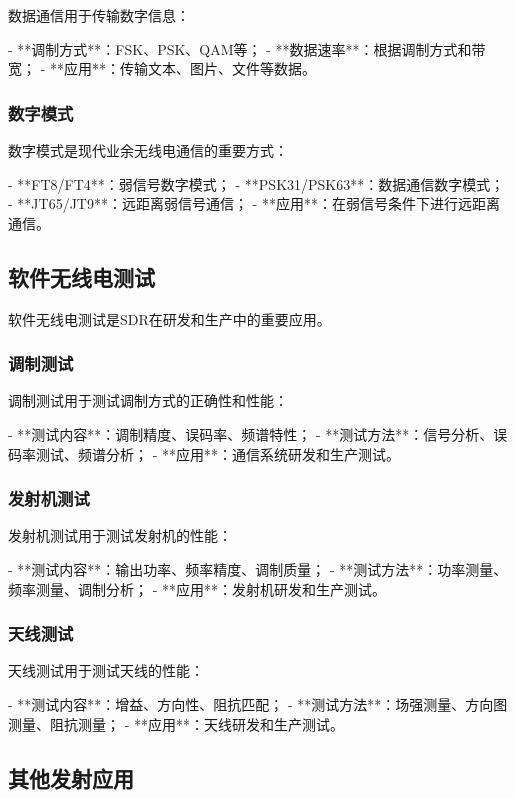 ﻿\documentclass[UTF8]{ctexbook}
\begin{document}
数据通信用于传输数字信息：

- **调制方式**：FSK、PSK、QAM等；
- **数据速率**：根据调制方式和带宽；
- **应用**：传输文本、图片、文件等数据。

\subsubsection{数字模式}

数字模式是现代业余无线电通信的重要方式：

- **FT8/FT4**：弱信号数字模式；
- **PSK31/PSK63**：数据通信数字模式；
- **JT65/JT9**：远距离弱信号通信；
- **应用**：在弱信号条件下进行远距离通信。

\subsection{软件无线电测试}

软件无线电测试是SDR在研发和生产中的重要应用。

\subsubsection{调制测试}

调制测试用于测试调制方式的正确性和性能：

- **测试内容**：调制精度、误码率、频谱特性；
- **测试方法**：信号分析、误码率测试、频谱分析；
- **应用**：通信系统研发和生产测试。

\subsubsection{发射机测试}

发射机测试用于测试发射机的性能：

- **测试内容**：输出功率、频率精度、调制质量；
- **测试方法**：功率测量、频率测量、调制分析；
- **应用**：发射机研发和生产测试。

\subsubsection{天线测试}

天线测试用于测试天线的性能：

- **测试内容**：增益、方向性、阻抗匹配；
- **测试方法**：场强测量、方向图测量、阻抗测量；
- **应用**：天线研发和生产测试。

\subsection{其他发射应用}
\end{document}
